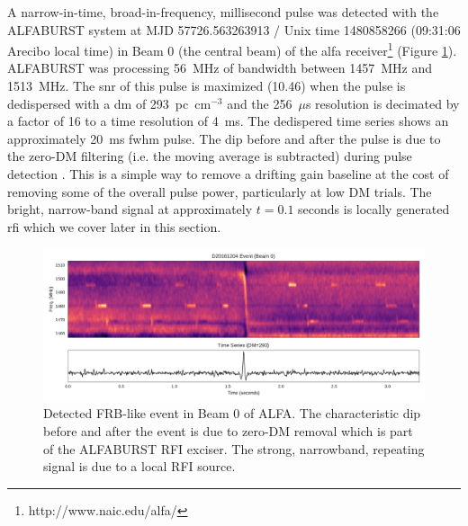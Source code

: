 \documentclass[a4paper,fleqn,usenatbib]{mnras}
\begin{document}
A narrow-in-time, broad-in-frequency, millisecond pulse was detected with the
ALFABURST system at MJD 57726.563263913 / Unix time 1480858266 (09:31:06 Arecibo
local time) in Beam 0 (the central beam) of the \gls{alfa}
receiver\footnote{http://www.naic.edu/alfa/} (Figure
\ref{fig:beam0_dynamic_spec_wide}). ALFABURST was processing 56~MHz of bandwidth
between 1457~MHz and 1513~MHz. The \gls{snr} of this pulse is maximized (10.46)
when the pulse is dedispersed with a \gls{dm} of 293~pc~cm$^{-3}$ and the
256~$\mu$s resolution is decimated by a factor of 16 to a time resolution of
4~ms. The dedispered time series shows an approximately 20~ms \gls{fwhm} pulse.
The dip before and after the pulse is due to the zero-DM filtering (i.e. the
moving average is subtracted) during pulse detection
\citep{2009MNRAS.395..410E}. This is a simple way to remove a drifting gain
baseline at the cost of removing some of the overall pulse power, particularly
at low DM trials. The bright, narrow-band signal at approximately $t=0.1$
seconds is locally generated \gls{rfi} which we cover later in this section.

\begin{figure}
    \includegraphics[width=1.0\linewidth]{figures/D20161204_buf23_Beam0_wide.pdf}
    \caption{Detected FRB-like event in Beam 0 of ALFA. The characteristic dip
    before and after the event is due to zero-DM removal which is part of the
    ALFABURST RFI exciser. The strong, narrowband, repeating signal is due to a
    local RFI source.
    }
    \label{fig:beam0_dynamic_spec_wide}
\end{figure}
\end{document}
